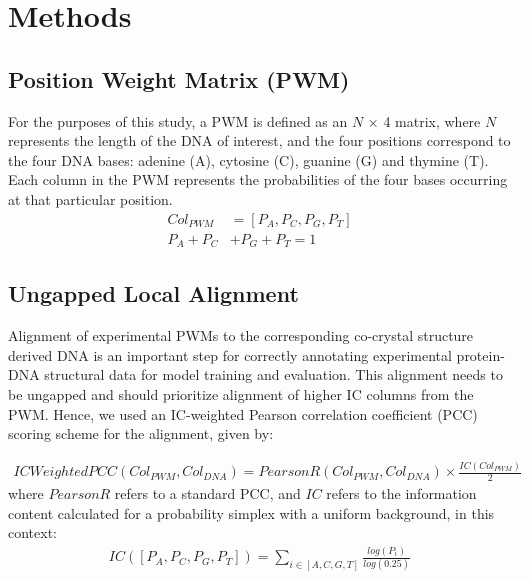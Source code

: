 \section{Methods}
\subsection{Position Weight Matrix (PWM)}
For the purposes of this study, a PWM is defined as an $N$ × 4 matrix,
where $N$ represents the length of the DNA of interest, and the four
positions correspond to the four DNA bases: adenine (A), cytosine (C),
guanine (G) and thymine (T). Each column in the PWM represents the
probabilities of the four bases occurring at that particular position.
\begin{align*}
Col_{PWM} &= [P_A, P_C, P_G, P_T]\\
P_A + P_C &+ P_G + P_T = 1
\end{align*}
\subsection{Ungapped Local Alignment}
Alignment of experimental PWMs to the corresponding co-crystal structure derived DNA is an important step for correctly annotating experimental protein-DNA structural data for model training and evaluation. This alignment needs to be ungapped and should prioritize alignment of higher IC columns from the PWM. Hence, we used an IC-weighted Pearson correlation coefficient (PCC) scoring scheme for the alignment, given by:

\begin{align}
ICWeightedPCC(Col_{PWM},Col_{DNA}) = PearsonR(Col_{PWM},Col_{DNA})\times \frac{IC(Col_{PWM})}{2}
\end{align}
where $PearsonR$ refers to a standard PCC, and $IC$ refers to the information content calculated for a probability simplex with a uniform background, in this context:
\begin{align}
IC([P_A,P_C,P_G,P_T]) = \sum\limits_{i\in[A,C,G,T]} \frac{log(P_i)}{log(0.25)}
\end{align}

